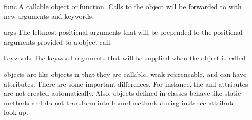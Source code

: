 \begin{memberdesc}[callable]{func}{}
A callable object or function.  Calls to the  object will
be forwarded to  with new arguments and keywords.
\end{memberdesc}

\begin{memberdesc}[tuple]{args}{}
The leftmost positional arguments that will be prepended to the
positional arguments provided to a  object call.
\end{memberdesc}

\begin{memberdesc}[dict]{keywords}{}
The keyword arguments that will be supplied when the  object
is called.
\end{memberdesc}

 objects are like  objects in that they are
callable, weak referencable, and can have attributes.  There are some
important differences.  For instance, the  and
 attributes are not created automatically.  Also,
 objects defined in classes behave like static methods and
do not transform into bound methods during instance attribute look-up.
